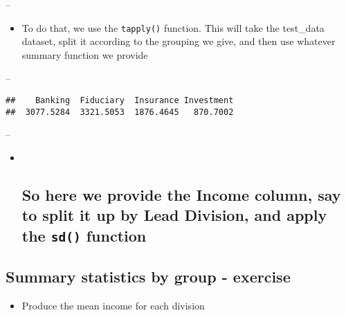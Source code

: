 \documentclass[]{article}
\newenvironment{Shaded}{\begin{snugshade}}{\end{snugshade}}
\newcommand{\KeywordTok}[1]{\textcolor[rgb]{0.13,0.29,0.53}{\textbf{#1}}}
\newcommand{\NormalTok}[1]{#1}
\newcommand{\OperatorTok}[1]{\textcolor[rgb]{0.81,0.36,0.00}{\textbf{#1}}}
\providecommand{\tightlist}{%
  \setlength{\itemsep}{0pt}\setlength{\parskip}{0pt}}
\begin{document}
--

\begin{itemize}
\tightlist
\item
  To do that, we use the \texttt{tapply()} function. This will take the
  test\_data dataset, split it according to the grouping we give, and
  then use whatever summary function we provide
\end{itemize}

--

\begin{Shaded}
\end{Shaded}

\begin{verbatim}
##    Banking  Fiduciary  Insurance Investment 
##  3077.5284  3321.5053  1876.4645   870.7002
\end{verbatim}

--

\begin{itemize}
\item ~
  \hypertarget{so-here-we-provide-the-income-column-say-to-split-it-up-by-lead-division-and-apply-the-sd-function}{%
  \subsection{\texorpdfstring{So here we provide the Income column, say
  to split it up by Lead Division, and apply the \texttt{sd()}
  function}{So here we provide the Income column, say to split it up by Lead Division, and apply the sd() function}}\label{so-here-we-provide-the-income-column-say-to-split-it-up-by-lead-division-and-apply-the-sd-function}}
\end{itemize}

\hypertarget{summary-statistics-by-group---exercise}{%
\subsection{Summary statistics by group -
exercise}\label{summary-statistics-by-group---exercise}}

\begin{itemize}
\tightlist
\item
  Produce the mean income for each division
\end{itemize}
\end{document}
